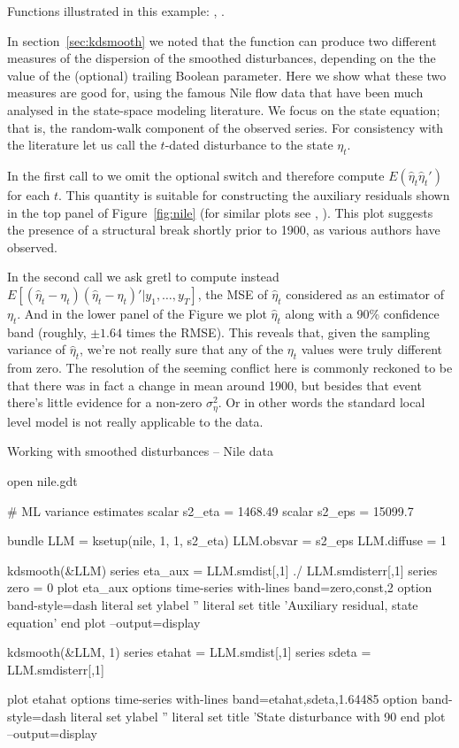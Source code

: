 Functions illustrated in this example: , .

In section~\ref{sec:kdsmooth} we noted that the 
function can produce two different measures of the dispersion of the
smoothed disturbances, depending on the the value of the (optional)
trailing Boolean parameter. Here we show what these two measures are
good for, using the famous Nile flow data that have been much analysed
in the state-space modeling literature. We focus on the state
equation; that is, the random-walk component of the observed series.
For consistency with the literature let us call the $t$-dated
disturbance to the state $\eta_t$.

In the first call to  we omit the optional switch and
therefore compute $E(\hat{\eta}_t\hat{\eta}_t')$ for each $t$. This
quantity is suitable for constructing the auxiliary residuals shown in
the top panel of Figure~\ref{fig:nile} (for similar plots see
\cite{koopman-etal99}, \cite{pelagatti11}).  This plot suggests the
presence of a structural break shortly prior to 1900, as various
authors have observed.

In the second  call we ask gretl to compute instead
$E[(\hat{\eta}_t-\eta_t)(\hat{\eta}_t-\eta_t)' | y_1,\ldots,y_T]$, the
MSE of $\hat{\eta}_t$ considered as an estimator of $\eta_t$. And in
the lower panel of the Figure we plot $\hat{\eta}_t$ along with a 90\%
confidence band (roughly, $\pm 1.64$ times the RMSE). This reveals
that, given the sampling variance of $\hat{\eta}_t$, we're not really
sure that any of the $\eta_t$ values were truly different from
zero. The resolution of the seeming conflict here is commonly reckoned
to be that there was in fact a change in mean around 1900, but besides
that event there's little evidence for a non-zero
$\sigma^2_{\eta}$. Or in other words the standard local level model is
not really applicable to the data.


\begin{script}[htbp]
  \caption{Working with smoothed disturbances -- Nile data}
  \label{script:auxres}
\begin{scode}
open nile.gdt

# ML variance estimates
scalar s2_eta = 1468.49
scalar s2_eps = 15099.7

bundle LLM = ksetup(nile, 1, 1, s2_eta)
LLM.obsvar = s2_eps
LLM.diffuse = 1

kdsmooth(&LLM)
series eta_aux = LLM.smdist[,1] ./ LLM.smdisterr[,1]
series zero = 0
plot eta_aux
    options time-series with-lines band=zero,const,2
    option band-style=dash
    literal set ylabel ''
    literal set title 'Auxiliary residual, state equation'
end plot --output=display

kdsmooth(&LLM, 1)
series etahat = LLM.smdist[,1]
series sdeta = LLM.smdisterr[,1]

plot etahat
    options time-series with-lines band=etahat,sdeta,1.64485
    option band-style=dash
    literal set ylabel ''
    literal set title 'State disturbance with 90%
end plot --output=display
\end{scode}
\end{script}

